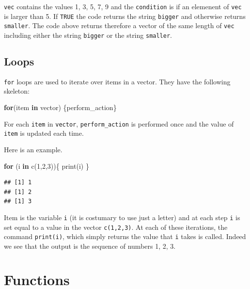 \documentclass[
]{book}
\newenvironment{Shaded}{\begin{snugshade}}{\end{snugshade}}
\newcommand{\ControlFlowTok}[1]{\textcolor[rgb]{0.13,0.29,0.53}{\textbf{#1}}}
\newcommand{\DecValTok}[1]{\textcolor[rgb]{0.00,0.00,0.81}{#1}}
\newcommand{\FunctionTok}[1]{\textcolor[rgb]{0.00,0.00,0.00}{#1}}
\newcommand{\NormalTok}[1]{#1}
\begin{document}
\texttt{vec} contains the values 1, 3, 5, 7, 9 and the \texttt{condition} is if an elemenent of \texttt{vec} is larger than 5. If \texttt{TRUE} the code returns the string \texttt{bigger} and otherwise returns \texttt{smaller}. The code above returns therefore a vector of the same length of \texttt{vec} including either the string \texttt{bigger} or the string \texttt{smaller}.

\hypertarget{loops}{%
\subsection{Loops}\label{loops}}

\texttt{for} loops are used to iterate over items in a vector. They have the following skeleton:

\begin{Shaded}
\begin{Highlighting}[]
\ControlFlowTok{for}\NormalTok{(item }\ControlFlowTok{in}\NormalTok{ vector) \{perform\_action\}}
\end{Highlighting}
\end{Shaded}

For each \texttt{item} in \texttt{vector}, \texttt{perform\_action} is performed once and the value of \texttt{item} is updated each time.

Here is an example.

\begin{Shaded}
\begin{Highlighting}[]
\ControlFlowTok{for}\NormalTok{ (i }\ControlFlowTok{in} \FunctionTok{c}\NormalTok{(}\DecValTok{1}\NormalTok{,}\DecValTok{2}\NormalTok{,}\DecValTok{3}\NormalTok{))\{}
  \FunctionTok{print}\NormalTok{(i)}
\NormalTok{\}}
\end{Highlighting}
\end{Shaded}

\begin{verbatim}
## [1] 1
## [1] 2
## [1] 3
\end{verbatim}

Item is the variable \texttt{i} (it is costumary to use just a letter) and at each step \texttt{i} is set equal to a value in the vector \texttt{c(1,2,3)}. At each of these iterations, the command \texttt{print(i)}, which simply returns the value that \texttt{i} takes is called. Indeed we see that the output is the sequence of numbers 1, 2, 3.

\hypertarget{functions}{%
\section{Functions}\label{functions}}
\end{document}

